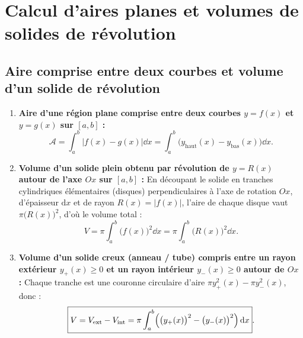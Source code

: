 \section{Calcul d'aires planes et volumes de solides de révolution}

\subsection{Aire comprise entre deux courbes et volume d'un solide de révolution}

\begin{theoreme}
\begin{enumerate}
    \item \textbf{Aire d'une région plane comprise entre deux courbes $y = f(x)$ et $y = g(x)$ sur $[a, b]$ :}
    \[
        \boxed{\mathcal{A} = \int_a^b \bigl|f(x) - g(x)\bigr|\dd x = \int_a^b \bigl(y_{\text{haut}}(x) - y_{\text{bas}}(x)\bigr)\dd x}.
    \]
    \item \textbf{Volume d'un solide plein obtenu par révolution de $y = R(x)$ autour de l'axe $Ox$ sur $[a, b]$ :}
    En découpant le solide en tranches cylindriques élémentaires (disques) perpendiculaires à l'axe de rotation $Ox$, d'épaisseur $\mathrm{d}x$ et de rayon $R(x) = |f(x)|$, l'aire de chaque disque vaut $\pi\bigl(R(x)\bigr)^2$, d'où le volume total :
    \[
        \boxed{V = \pi \int_a^b \bigl(f(x)\bigr)^2\dd x = \pi \int_a^b \bigl(R(x)\bigr)^2\dd x}.
    \]
    \item \textbf{Volume d'un solide creux (anneau / tube) compris entre un rayon extérieur $y_+(x) \ge 0$ et un rayon intérieur $y_-(x) \ge 0$ autour de $Ox$ :}
    Chaque tranche est une couronne circulaire d'aire $\pi y_+^2(x) - \pi y_-^2(x)$, donc :
    \[
        \boxed{V = V_{\text{ext}} - V_{\text{int}} = \pi \int_a^b \Bigl(\bigl(y_+(x)\bigr)^2 - \bigl(y_-(x)\bigr)^2\Bigr)\,\mathrm{d} x}.
    \]
\end{enumerate}
\end{theoreme}

